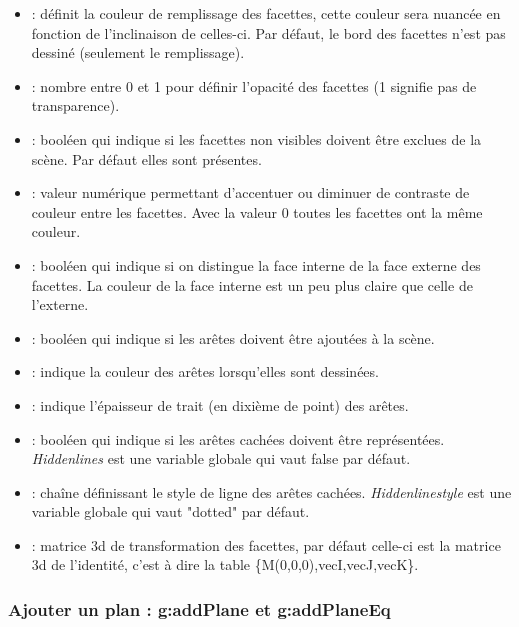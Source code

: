 \documentclass[%
10pt,%
a4paper,%
french,%
]%
{article}%
\begin{document}
    \begin{itemize}
        \item {} : définit la couleur de remplissage des facettes, cette couleur sera nuancée en fonction de l'inclinaison de celles-ci. Par défaut, le bord des facettes n'est pas dessiné (seulement le remplissage).
        \item {} : nombre entre 0 et 1 pour définir l'opacité des facettes (1 signifie pas de transparence).
        \item {} : booléen qui indique si les facettes non visibles doivent être exclues de la scène. Par défaut elles sont présentes.
        \item {} : valeur numérique permettant d'accentuer ou diminuer de contraste de couleur entre les facettes. Avec la valeur 0 toutes les facettes ont la même couleur.
        \item {} : booléen qui indique si on distingue la face interne de la face externe des facettes. La couleur de la face interne est un peu plus claire que celle de l'externe.
        
        \item {} : booléen qui indique si les arêtes doivent être ajoutées à la scène.
        \item {} : indique la couleur des arêtes lorsqu'elles sont dessinées.
        \item {} : indique l'épaisseur de trait (en dixième de point) des arêtes.
        \item {} : booléen qui indique si les arêtes cachées doivent être représentées. \emph{Hiddenlines} est une variable globale qui vaut false par défaut.
        \item {} : chaîne définissant le style de ligne des arêtes cachées. \emph{Hiddenlinestyle} est une variable globale qui vaut "dotted" par défaut.
        \item {} : matrice 3d de transformation des facettes, par défaut celle-ci est la matrice 3d de l'identité, c'est à dire la table \{M(0,0,0),vecI,vecJ,vecK\}.
    \end{itemize}

\subsubsection{Ajouter un plan : g:addPlane et g:addPlaneEq}
\end{document}
